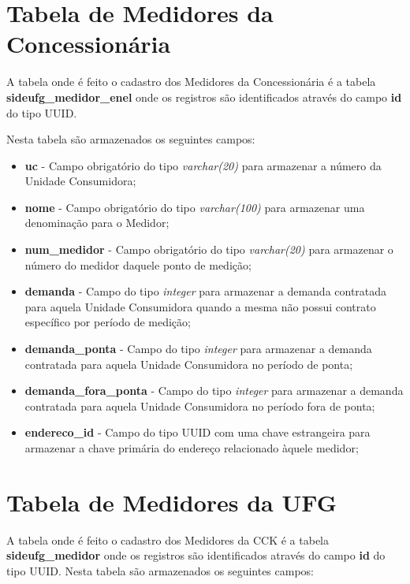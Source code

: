 \section{Tabela de Medidores da Concessionária}

A tabela onde é feito o cadastro dos Medidores da Concessionária é a tabela \textbf{sideufg\_medidor\_enel} onde os registros são identificados através do campo \textbf{id} do tipo UUID.

Nesta tabela são armazenados os seguintes campos:

\begin{itemize}
    \item \textbf{uc} - Campo obrigatório do tipo \textit{varchar(20)} para armazenar a número da Unidade Consumidora;
    \item \textbf{nome} - Campo obrigatório do tipo \textit{varchar(100)} para armazenar uma denominação para o Medidor;
    \item \textbf{num\_medidor} - Campo obrigatório do tipo \textit{varchar(20)} para armazenar o número do medidor daquele ponto de medição;
    \item \textbf{demanda} - Campo do tipo \textit{integer} para armazenar a demanda contratada para aquela Unidade Consumidora quando a mesma não possui contrato específico por período de medição;
    \item \textbf{demanda\_ponta} - Campo do tipo \textit{integer} para armazenar a demanda contratada para aquela Unidade Consumidora no período de ponta;
    \item \textbf{demanda\_fora\_ponta} - Campo do tipo \textit{integer} para armazenar a demanda contratada para aquela Unidade Consumidora no período fora de ponta;
    \item \textbf{endereco\_id} - Campo do tipo UUID com uma chave estrangeira para armazenar a chave primária do endereço relacionado àquele medidor;
\end{itemize}

\section{Tabela de Medidores da UFG}

A tabela onde é feito o cadastro dos Medidores da CCK é a tabela \textbf{sideufg\_medidor} onde os registros são identificados através do campo \textbf{id} do tipo UUID.
\newpage
Nesta tabela são armazenados os seguintes campos:


